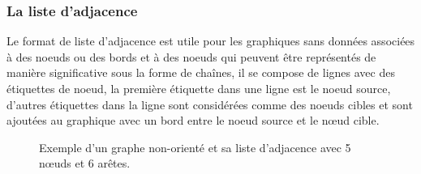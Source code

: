 \subsubsection{La liste d’adjacence}
Le format de liste d'adjacence est utile pour les graphiques sans données associées à des noeuds ou des bords et à des noeuds
qui peuvent être représentés de manière significative sous la forme de chaînes, il se compose de 
lignes avec des étiquettes de noeud, la première étiquette dans une ligne est le noeud source, d'autres étiquettes dans la
ligne sont considérées comme des noeuds cibles et sont ajoutées au graphique avec un bord entre le noeud source et le nœud 
cible.\\
\begin{figure}[h]
	\centering
	\caption{Exemple d'un graphe non-orienté et sa liste d'adjacence avec 5 nœuds et 6 arêtes.}
	\label{matrice d'adjacence1}
\end{figure}

